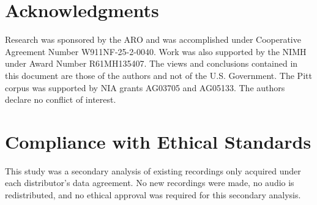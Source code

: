 \documentclass{article}
\begin{document}
\section*{Acknowledgments}
Research was sponsored by the ARO and was accomplished under Cooperative Agreement Number W911NF-25-2-0040. Work was also supported by the NIMH under Award Number R61MH135407. The views and conclusions contained in this document are those of the authors and not of the  U.S. Government. The Pitt corpus was supported by NIA grants AG03705 and AG05133. The authors declare no conflict of interest.
\section*{Compliance with Ethical Standards}
This study was a secondary analysis of existing recordings only acquired under each distributor's data agreement. No new recordings were made, no audio is redistributed, and no ethical approval was required for this secondary analysis.
\end{document}
